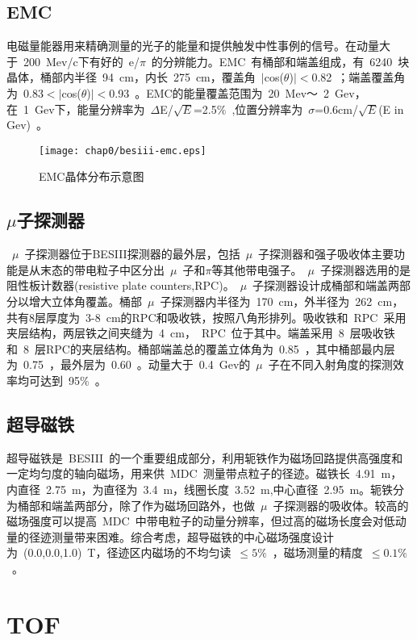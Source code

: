 \subsection{EMC}
电磁量能器用来精确测量的光子的能量和提供触发中性事例的信号。在动量大于~200~Mev/c下有好的~e/$\pi$~的分辨能力。EMC~有桶部和端盖组成，有~6240~块晶体，桶部内半径~94~cm，内长~275~cm，覆盖角~$|$cos($\theta$)$|<$0.82~；端盖覆盖角为~0.83$<|$cos($\theta$)$|<$0.93~。EMC的能量覆盖范围为~20~Mev～~2~Gev，在~1~Gev下，能量分辨率为~$\Delta$E/$\sqrt E$=2.5$\%$~,位置分辨率为~$\sigma$=0.6cm/$\sqrt E$(E in Gev)~。
\begin{figure}[!h]
  \centering
  \texttt{[image: chap0/besiii-emc.eps]}
  \caption{EMC晶体分布示意图}
  \label{fig:besiii-emc}
\end{figure}

\subsection{$\mu$子探测器}

~$\mu$~子探测器位于BESIII探测器的最外层，包括~$\mu$~子探测器和强子吸收体主要功能是从末态的带电粒子中区分出~$\mu$~子和$\pi$等其他带电强子。~$\mu$~子探测器选用的是阻性板计数器(resistive plate counters,RPC)。~$\mu$~子探测器设计成桶部和端盖两部分以增大立体角覆盖。桶部~$\mu$~子探测器内半径为~170~cm，外半径为~262~cm，共有8层厚度为~3-8~cm的RPC和吸收铁，按照八角形排列。吸收铁和~RPC~采用夹层结构，两层铁之间夹缝为~4~cm，~RPC~位于其中。端盖采用~8~层吸收铁和~8~层RPC的夹层结构。桶部端盖总的覆盖立体角为~0.85~，其中桶部最内层为~0.75~，最外层为~0.60~。动量大于~0.4~Gev的~$\mu$~子在不同入射角度的探测效率均可达到~95$\%$~。

\subsection{超导磁铁}

超导磁铁是~BESIII~的一个重要组成部分，利用轭铁作为磁场回路提供高强度和一定均匀度的轴向磁场，用来供~MDC~测量带点粒子的径迹。磁铁长~4.91~m，内直径~2.75~m，为直径为~3.4~m，线圈长度~3.52~m,中心直径~2.95~m。轭铁分为桶部和端盖两部分，除了作为磁场回路外，也做~$\mu$~子探测器的吸收体。较高的磁场强度可以提高~MDC~中带电粒子的动量分辨率，但过高的磁场长度会对低动量的径迹测量带来困难。综合考虑，超导磁铁的中心磁场强度设计为~(0.0,0.0,1.0)~T，径迹区内磁场的不均匀读~$\leq5\%$~，磁场测量的精度~$\leq0.1\%$~。

\section{TOF}
